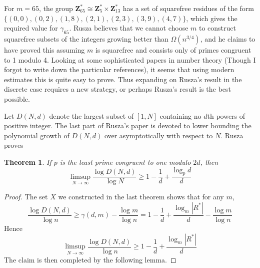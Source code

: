 \documentclass{report}
\theoremstyle{plain}
\theoremstyle{plain}
\newtheorem{theorem}{Theorem}
\begin{document}
For $m = 65$, the group $\mathbf{Z}_{65}^* \cong \mathbf{Z}_{5}^* \times \mathbf{Z}_{13}^*$ has a set of squarefree residues of the form $\{ (0,0), (0,2), (1,8), (2,1), (2,3), (3,9), (4,7) \}$, which gives the required value for $\gamma_{65}$. Rusza believes that we cannot choose $m$ to construct squarefree subsets of the integers growing better than $\Omega(n^{3/4})$, and he claims to have proved this assuming $m$ is squarefree and consists only of primes congruent to 1 modulo 4. Looking at some sophisticated papers in number theory (Though I forgot to write down the particular references), it seems that using modern estimates this is quite easy to prove. Thus expanding on Rusza's result in the discrete case requires a new strategy, or perhaps Rusza's result is the best possible.

Let $D(N,d)$ denote the largest subset of $[1,N]$ containing no $d$th powers of positive integer. The last part of Rusza's paper is devoted to lower bounding the polynomial growth of $D(N,d)$ over asymptotically with respect to $N$. Rusza proves

\begin{theorem}
    If $p$ is the least prime congruent to one modulo $2d$, then
    \[ \limsup_{N \to \infty} \frac{\log D(N,d)}{\log N} \geq 1 - \frac{1}{d} + \frac{\log_p d}{d} \]
\end{theorem}
\begin{proof}
    The set $X$ we constructed in the last theorem shows that for any $m$,
    \[ \frac{\log D(N,d)}{\log n} \geq \gamma(d,m) - \frac{\log m}{\log n} = 1 - \frac{1}{d} + \frac{\log_m |R^*|}{d} - \frac{\log m}{\log n} \]
    Hence
    \[ \limsup_{N \to \infty} \frac{\log D(N,d)}{\log n} \geq 1 - \frac{1}{d} + \frac{\log_m |R^*|}{d} \]
    The claim is then completed by the following lemma.
\end{proof}
\end{document}
